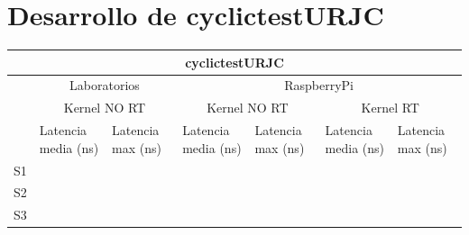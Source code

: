 \documentclass[12pt, a4paper]{report}
\begin{document}
	\chapter*{Desarrollo de cyclictestURJC}
	\begin{center}
		\setlength\extrarowheight{4pt}
		\begin{tabular}{ |p{1cm}|p{2cm}|p{2cm}|p{2cm}|p{2cm}|p{2cm}|p{2cm}| } 
			\hline
			\multicolumn{7}{|c|}{\textbf{cyclictestURJC}}\\ 
			\hline
			& \multicolumn{2}{|c|}{Laboratorios} & \multicolumn{4}{|c|}{RaspberryPi}\\ 
			\cline{2-7}
			& \multicolumn{2}{|c|}{Kernel NO RT} & \multicolumn{2}{|c|}{Kernel NO RT} & \multicolumn{2}{|c|}{Kernel RT}\\ 
			\cline{2-7}
			& Latencia media (ns) & Latencia max (ns)& Latencia media (ns) & Latencia max (ns)& Latencia media (ns) & Latencia max (ns)\\ 
			\hline
			S1 & & & & & &\\ 
			\hline
			S2 & & & & & &\\ 
			\hline
			S3 & & & & & &\\ 
			\hline
		\end{tabular}
	\end{center}
\end{document}

